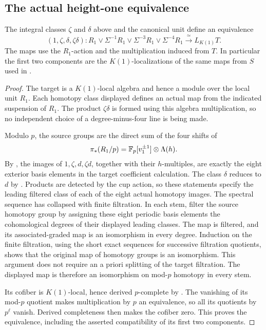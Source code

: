 \subsection{The actual height-one equivalence}

\begin{theorem}\label{h3:thm:height-one-maps}
The integral classes \(\zeta\) and \(\delta\) above
and the canonical unit define an equivalence
\[
 (1,\zeta,\delta,\zeta\delta):
 R_1\vee\Sigma^{-1}R_1\vee
       \Sigma^{-3}R_1\vee\Sigma^{-4}R_1
      \xrightarrow{\ \simeq\ }L_{K(1)}T.
\]
The maps use the \(R_1\)-action and the multiplication
induced from \(T\).  In particular the first two
components are the \(K(1)\)-localizations of the
same maps from \(S\) used in
.
\end{theorem}

\begin{proof}
The target is a \(K(1)\)-local algebra and hence a
module over the local unit \(R_1\).  Each homotopy
class displayed defines an actual map from the
indicated suspension of \(R_1\).  The product
\(\zeta\delta\) is formed using this algebra
multiplication, so no independent choice of a
degree-minus-four line is being made.

Modulo \(p\), the source groups are the direct sum
of the four shifts of
\[
 \pi_*(R_1/p)
     =\mathbb F_p[v_1^{\pm1}]\otimes\Lambda(h).
\]
By , the images of
\(1,\zeta,d,\zeta d\), together with their
\(h\)-multiples, are exactly the eight exterior
basis elements in the target coefficient
calculation.  The class \(\delta\) reduces to \(d\)
by .
Products are detected by the cup action, so these
statements specify the leading filtered class of
each of the eight actual homotopy images.
The spectral sequence has collapsed with finite filtration.  In each
stem, filter the source homotopy group by assigning these eight
periodic basis elements the cohomological degrees of their displayed
leading classes.  The map is filtered, and its associated-graded map
is an isomorphism in every degree.  Induction on the finite filtration,
using the short exact sequences for successive filtration quotients,
shows that the original map of homotopy groups is an isomorphism.
This argument does not require an a priori splitting of the target
filtration.  The displayed map is therefore an isomorphism on
mod-\(p\) homotopy in every stem.

Its cofiber is \(K(1)\)-local, hence derived
\(p\)-complete by .  The vanishing of its mod-\(p\)
quotient makes multiplication by \(p\) an
equivalence, so all its quotients by \(p^\ell\)
vanish.  Derived completeness then makes the
cofiber zero.  This proves the equivalence,
including the asserted compatibility of its
first two components.
\end{proof}
